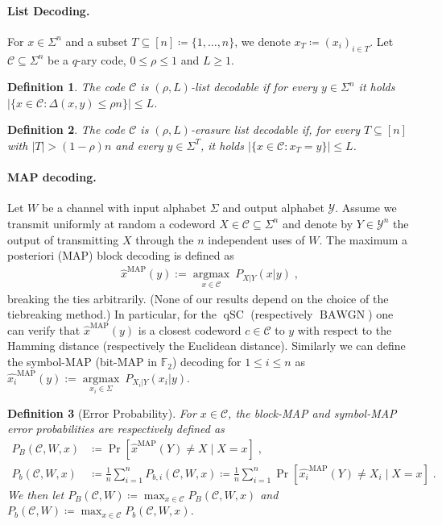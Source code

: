 \documentclass{article}
\DeclareMathOperator*{\argmax}{argmax}
\DeclareMathOperator{\qSC}{qSC}
\DeclareMathOperator{\MAP}{MAP}
\DeclareMathOperator{\BAWGN}{BAWGN}
\newcommand{\cC}{\mathcal{C}}
\newcommand{\bF}{\mathbb{F}}
\theoremstyle{plain}
\newtheorem{definition}{Definition}%
\theoremstyle{plain}
\theoremstyle{plain}
\theoremstyle{plain}
\theoremstyle{plain}
\theoremstyle{plain}
\theoremstyle{plain}
\theoremstyle{plain}
\theoremstyle{plain}
\theoremstyle{plain}
\theoremstyle{remark}
\theoremstyle{remark}
\theoremstyle{remark}
\theoremstyle{plain}
\begin{document}
\paragraph{List Decoding.}
For $x\in\Sigma^n$ and a subset 
$T\subseteq[n]\coloneqq\{1,\ldots,n\}$, we denote $x_T\coloneqq(x_i)_{i\in T}$. 
Let $\cC\subseteq\Sigma^n$ be a $q$-ary code, 
$0\le\rho\le 1$ and $L\ge 1$.
\begin{definition}
    The code $\cC$ is $(\rho,L)$-list decodable if for every $y\in\Sigma^n$ it holds
    $|\{x\in \cC:\Delta(x,y)\le\rho n\}|\le L$.
\end{definition}
\begin{definition}
    The code $\cC$ is $(\rho,L)$-erasure list decodable if,
for every $T\subseteq[n]$ with $|T|> (1-\rho)n$
and every $y\in\Sigma^T$, it holds
$|\{x\in \cC: x_T=y\}|\le L$.
\end{definition}
\paragraph{MAP decoding.}
Let $W$ be a channel with input alphabet $\Sigma$
and
output alphabet $\mathcal{Y}$. Assume we transmit uniformly at random a codeword $X\in\cC\subseteq\Sigma^n$ and denote by $Y\in\mathcal{Y}^n$ the output of transmitting $X$ through the $n$ 
independent uses of $W$. The maximum a posteriori (MAP) block decoding  is defined as 
\begin{align*}
    \hat{x}^{\MAP}(y):=\underset{x\in\cC}{\argmax} \ P_{X|Y}(x|y)\;,
\end{align*}
breaking the ties arbitrarily. (None of our results
depend on the choice of the tiebreaking method.)
In particular, for the $\qSC$ (respectively $\BAWGN$) one can verify that $\hat{x}^{\MAP}(y)$ is a closest codeword $c\in\cC$ to $y$ with respect to the Hamming distance (respectively the Euclidean distance). Similarly we can define the symbol-MAP (bit-MAP in $\bF_2$) decoding for $1\le i\le n$ as
$\hat{x_i}^{\MAP}(y):=\underset{x_i\in\Sigma}{\argmax}\ P_{X_i|Y}(x_i|y)$.
\begin{definition}[Error Probability]
For $x\in\cC$,
the block-MAP and symbol-MAP error probabilities are respectively defined as
\begin{align*}
    P_{B}(\cC,W,x)&\coloneqq
    \Pr\left[ \hat{x}^{\MAP}(Y)\neq X\;\vert\;X=x\right]\;,\
    \\P_{b}(\cC,W,x)
    &\coloneqq\frac{1}{n}\sum_{i=1}^n P_{b,i}(\cC,W,x)
    \coloneqq\frac{1}{n}\sum_{i=1}^n
    \Pr\left[ \hat{x_i}^{\MAP}(Y)\neq X_i
    \;\vert\;X=x\right]\;.
\end{align*}
We then let
$P_B(\cC,W)\coloneqq\max_{x\in\cC} P_B(\cC,W,x)$
and $P_b(\cC,W)\coloneqq\max_{x\in\cC}
P_b(\cC,W,x)$.
\end{definition}
\end{document}
